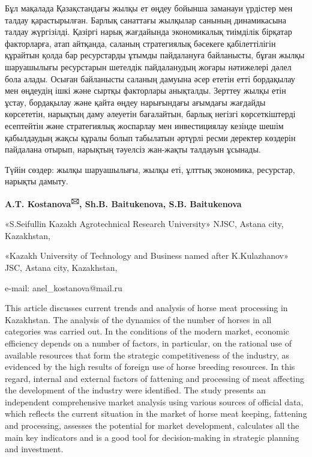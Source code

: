 Бұл мақалада Қазақстандағы жылқы ет өңдеу бойынша заманауи үрдістер мен
талдау қарастырылған. Барлық санаттағы жылқылар санының динамикасына
талдау жүргізілді. Қазіргі нарық жағдайында экономикалық тиімділік
бірқатар факторларға, атап айтқанда, саланың стратегиялық бәсекеге
қабілеттілігін құрайтын қолда бар ресурстарды ұтымды пайдалануға
байланысты, бұған жылқы шаруашылығы ресурстарын шетелдік пайдаланудың
жоғары нәтижелері дәлел бола алады. Осыған байланысты саланың дамуына
әсер ететін етті бордақылау мен өңдеудің ішкі және сыртқы факторлары
анықталды. Зерттеу жылқы етін ұстау, бордақылау және қайта өңдеу
нарығындағы ағымдағы жағдайды көрсететін, нарықтың даму әлеуетін
бағалайтын, барлық негізгі көрсеткіштерді есептейтін және стратегиялық
жоспарлау мен инвестициялау кезінде шешім қабылдаудың жақсы құралы болып
табылатын әртүрлі ресми деректер көздерін пайдалана отырып, нарықтың
тәуелсіз жан-жақты талдауын ұсынады.

Түйін сөздер: жылқы шаруашылығы, жылқы еті, ұлттық экономика, ресурстар,
нарықты дамыту.

\begin{center}

{\bfseries A.T. Kostanova\textsuperscript{🖂}, Sh.B. Baitukenova, S.B.
Baitukenova}

«S.Seifullin Kazakh Agrotechnical Research University» NJSC, Astana city, Kazakhstan,

«Kazakh University of Technology and Business named after K.Kulazhanov» JSC, Astana city, Kazakhstan,

e-mail: anel\_kostanova@mail.ru
\end{center}

This article discusses current trends and analysis of horse meat
processing in Kazakhstan. The analysis of the dynamics of the number of
horses in all categories was carried out. In the conditions of the
modern market, economic efficiency depends on a number of factors, in
particular, on the rational use of available resources that form the
strategic competitiveness of the industry, as evidenced by the high
results of foreign use of horse breeding resources. In this regard,
internal and external factors of fattening and processing of meat
affecting the development of the industry were identified. The study
presents an independent comprehensive market analysis using various
sources of official data, which reflects the current situation in the
market of horse meat keeping, fattening and processing, assesses the
potential for market development, calculates all the main key indicators
and is a good tool for decision-making in strategic planning and
investment.

